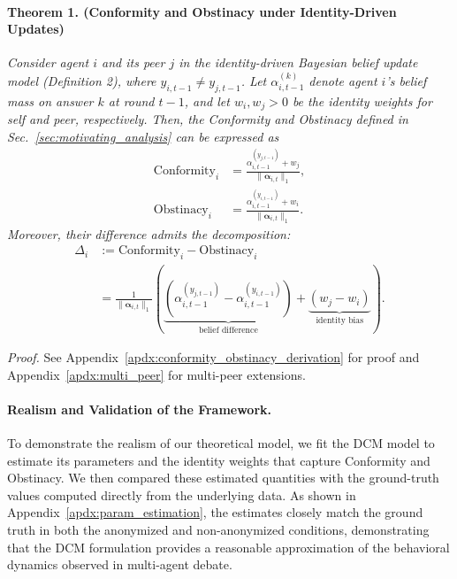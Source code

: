 \documentclass{article}
\begin{document}
\paragraph{Theorem 1. (Conformity and Obstinacy under Identity-Driven Updates)}
\textit{Consider agent $i$ and its peer $j$ in the identity-driven Bayesian belief update model (Definition 2), where $y_{i,t-1} \neq y_{j,t-1}$.  
Let $\alpha_{i,t-1}^{(k)}$ denote agent $i$’s belief mass on answer $k$ at round $t-1$, and let $w_i, w_j > 0$ be the identity weights for self and peer, respectively.  
Then, the Conformity and Obstinacy  defined in Sec.~\ref{sec:motivating_analysis} can be expressed as
\begin{align}
    \text{Conformity}_i &= \frac{\alpha_{i,t-1}^{(y_{j,t-1})} + w_j } {\|\boldsymbol\alpha_{i,t}\|_1},\\
    \text{Obstinacy}_i &= \frac{\alpha_{i,t-1}^{(y_{i,t-1})} + w_i } {\|\boldsymbol\alpha_{i,t}\|_1}.
\end{align}
Moreover, their difference admits the decomposition:
\begin{align}
\Delta_i &:= \text{Conformity}_i - \text{Obstinacy}_i \\
&=  \frac{1}{\|\boldsymbol\alpha_{i,t}\|_1} \left( \underset{\text{belief difference}}{\underbrace{(\alpha_{i,t-1}^{(y_{j,t-1})} - \alpha_{i,t-1}^{(y_{i,t-1})})}} + \underset{\text{identity bias}}{\underbrace{(w_j - w_i)}}\right)
     \label{eq:delta_single_peer}.
\end{align}
} 

\noindent\textit{Proof.} See Appendix~\ref{apdx:conformity_obstinacy_derivation} for proof and Appendix~\ref{apdx:multi_peer} for multi-peer extensions.

\paragraph{Realism and Validation of the Framework.}  To demonstrate the realism of our theoretical model,  we fit the DCM model to estimate its parameters and the identity weights that capture Conformity and Obstinacy. We then compared these estimated quantities with the ground-truth values computed directly from the underlying data. As shown in Appendix~\ref{apdx:param_estimation}, the estimates closely match the ground truth in both the anonymized and non-anonymized conditions, demonstrating that the DCM formulation provides a reasonable approximation of the behavioral dynamics observed in multi-agent debate.
\end{document}
